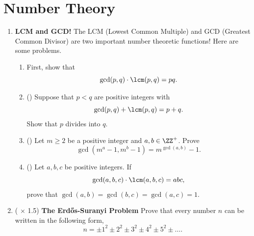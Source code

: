 \documentclass[11pt]{scrartcl}
\begin{document}
\section{Number Theory}
\begin{enumerate}[label=\textbf{N\arabic*}.]
    \item \textbf{LCM and GCD!} \newline
    The LCM (Lowest Common Multiple) and GCD (Greatest Common Divisor) are two important number theoretic functions! Here are some problems.
    
    \begin{enumerate}
        \item First, show that
        \[ \gcd(p, q) \cdot \lcm(p, q) = pq. \]
    
        \item (\halfchili) Suppose that $p < q$ are positive integers with
        \[ \gcd(p, q) + \lcm(p, q) = p + q. \]
        Show that $p$ divides into $q$.
        
        \item (\fullchili) Let $m \geq 2$ be a positive integer and $a, b \in \ZZ^+$. Prove \[ \gcd(m^a - 1, m^b - 1) = m^{\gcd(a, b)} - 1. \]
        
        \item (\fullchili) Let $a, b, c$ be positive integers. If
        \[ \gcd(a, b, c) \cdot \lcm(a, b, c) = abc, \]
        prove that $\gcd(a, b) = \gcd(b, c) = \gcd(a, c) = 1$.
    \end{enumerate}
    
    \item (\fullchili \hspace{1pt} $\times$ 1.5) \textbf{The Erd\H{o}s-Suranyi Problem} \newline
    Prove that every number $n$ can be written in the following form,
    \[ n = \pm 1^2 \pm 2^2 \pm 3^2 \pm 4^2 \pm 5^2 \pm \dots. \]
\end{enumerate}
\end{document}
